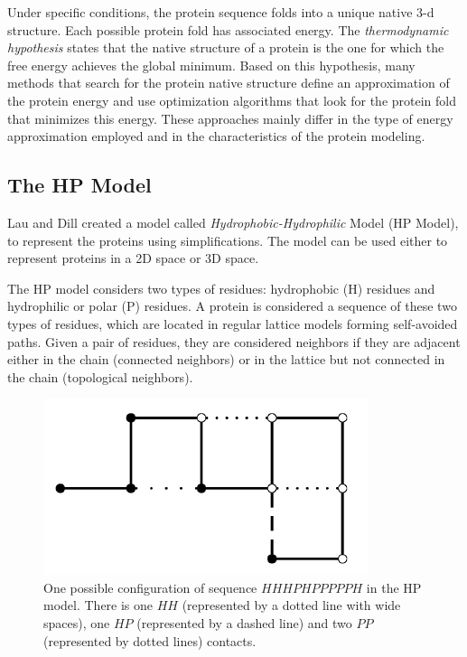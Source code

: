 Under specific conditions, the protein sequence folds into a unique native 3-d structure. Each possible protein fold has associated energy. The \emph{thermodynamic hypothesis} states that the native structure of a protein is the one for which the free energy achieves the global minimum. Based on this hypothesis, many methods that search for the protein native structure define an approximation of the protein energy and use optimization algorithms that look for the protein fold that minimizes this energy. These approaches mainly differ in the type of energy approximation employed and in the characteristics of the protein modeling.


\subsection{The HP Model}


Lau and Dill \cite{lau1989lattice} created a model called \textit{Hydrophobic-Hydrophilic} Model (HP Model), to represent the proteins using simplifications. The model can be used either to represent proteins in a 2D space or 3D space.


The HP model considers two types of residues:  hydrophobic (H) residues  and hydrophilic or polar (P) residues. A protein is considered a sequence of these two types of residues, which are located in regular lattice models forming self-avoided paths. Given a pair of residues, they are considered neighbors if they are adjacent  either in the chain (connected neighbors) or  in the lattice but not connected in the chain (topological neighbors).


\begin{figure}[htb!] \label{fig:PROTEXAM}
	\centering
	\includegraphics[scale=0.7]{figures/protein_example.png}
	\caption{One possible configuration of  sequence $HHHPHPPPPPH$ in the HP model. There is one $HH$ (represented by a dotted line with wide spaces), one $HP$ (represented by a dashed line) and  two $PP$  (represented by dotted lines) contacts.}
\end{figure}


